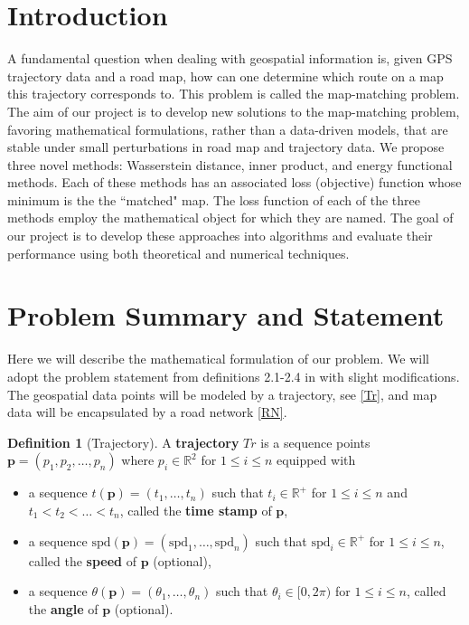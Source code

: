 \documentclass{article}
\numberwithin{equation}{section}
\theoremstyle{definition}
\newtheorem{definition}{Definition}[section]
\begin{document}
\section{Introduction}
A fundamental question when dealing with geospatial information is, given GPS trajectory data and a road map, how can one determine which route on a map this trajectory corresponds to. This problem is called the map-matching problem. The aim of our project is to develop new solutions to the map-matching problem, favoring mathematical formulations, rather than a data-driven models, that are stable under small perturbations in road map and trajectory data. We propose three novel methods: Wasserstein distance, inner product, and energy functional methods. Each of these methods has an associated loss (objective) function whose minimum is the the ``matched" map. The loss function of each of the three methods employ the mathematical object for which they are named. The goal of our project is to develop these approaches into algorithms and evaluate their performance using both theoretical and numerical techniques. 



\section{Problem Summary and Statement} \label{PS}

 Here we will describe the mathematical formulation of our problem. We will adopt the problem statement from definitions 2.1-2.4 in \cite{CXHZ} with slight modifications. The geospatial data points will be modeled by a trajectory, see \autoref{Tr}, and map data will be encapsulated by a road network \autoref{RN}.
\begin{definition}[Trajectory] \label{Tr}
A \textbf{trajectory} $Tr$ is a sequence points $\mathbf{p} = (p_1,p_2,\dots, p_n)$ where $p_i\in \mathbb{R}^2$ for $1\leq i\leq n$ equipped with 
\begin{itemize}
    \item a sequence $t(\mathbf{p}) = (t_1,\dots,t_{n})$ such that $t_i\in \mathbb{R}^{+}$ for $1\leq i\leq n$ and  $t_1<t_2<\dots <t_n$, called the \textbf{time stamp} of $\mathbf{p}$,
    \item a sequence $\text{spd}(\mathbf{p}) = (\text{spd}_1,\dots,\text{spd}_{n})$ such that  $\text{spd}_i\in \mathbb{R}^{+}$  for $1\leq i\leq n$, called the \textbf{speed} of $\mathbf{p}$ (optional),
    \item a sequence $\theta(\mathbf{p}) = (\theta_1, \dots, \theta_n)$ such that $\theta_i\in [0,2\pi)$  for $1\leq i\leq n$, called the \textbf{angle} of $\mathbf{p}$ (optional).
\end{itemize}
\end{definition}
\end{document}
